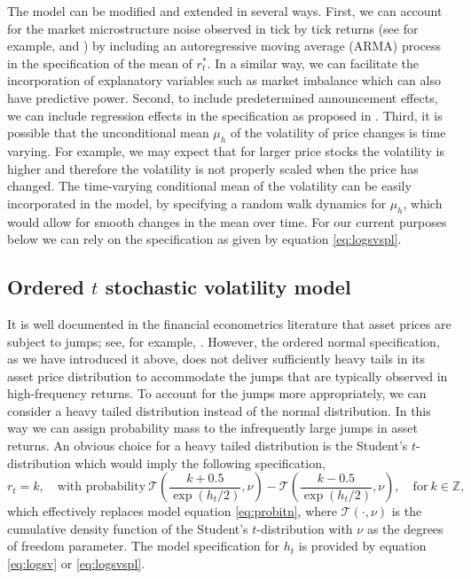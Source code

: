 \documentclass[12pt]{article}
\begin{document}
The model can be modified and extended in several ways.
First, we can account for the
market microstructure noise observed in tick by tick returns (see for example,
\citet{AitSahaliaMyklandZhang2011} and \citet{GriffinOomen2008}) by
including an autoregressive moving average (ARMA) process
in the specification of the mean of $r^{*}_{t}$.
In a similar way, we can facilitate the incorporation of explanatory
variables such as market imbalance which can also have predictive power.
Second, to include predetermined announcement effects, we can
include regression effects in
the specification as proposed in \citet{JohannesStroud2014}.
Third, it is possible that the unconditional mean $\mu _h$ of the volatility of
price changes is time varying.
For example, we may expect that for larger price stocks the volatility
is higher and therefore the volatility is not properly scaled when the price
has changed.
The time-varying conditional mean of the volatility can be easily
incorporated in the model, by specifying a random walk dynamics
for $\mu_{h}$, which would allow for smooth changes in the mean over time.
For our current purposes below we can rely on the specification as given by
equation \eqref{eq:logsvspl}.


\subsection{Ordered $t$ stochastic volatility model}\label{c_sec:ordert}

It is well documented in the financial econometrics literature that
asset prices are subject to jumps; see, for example, \citet{AitSahaliaJacodLi2012}.
However, the ordered normal specification, as we have introduced it above,
does not deliver sufficiently heavy tails
in its asset price distribution to accommodate the jumps that are
typically observed in high-frequency returns.
To account for the jumps more appropriately,
we can consider a heavy tailed distribution instead of the normal distribution.
In this way we can assign probability mass to the infrequently large jumps
in asset returns.
An obvious choice for a heavy tailed distribution is the Student's $t$-distribution
which would imply the following specification,
\begin{equation}
\label{eq:probitt}
r_{t} =k, \quad \text{with probability} \
\mathcal{T}\left(\frac{k+0.5}{  \exp(h_t/2)} ,\nu \right)-
\mathcal{T}\left(\frac{k-0.5}{ \exp(h_t/2)},\nu\right),
\quad \text{for} \ k \in \mathbb{Z},
\end{equation}
which effectively replaces model equation \eqref{eq:probitn},
where $\mathcal{T}\left(\cdot,\nu \right)$ is the
cumulative density function of the
Student's $t$-distribution with $\nu$ as the degrees of freedom parameter.
The model specification for $h_t$ is provided by equation \eqref{eq:logsv} or
\eqref{eq:logsvspl}.
\end{document}
